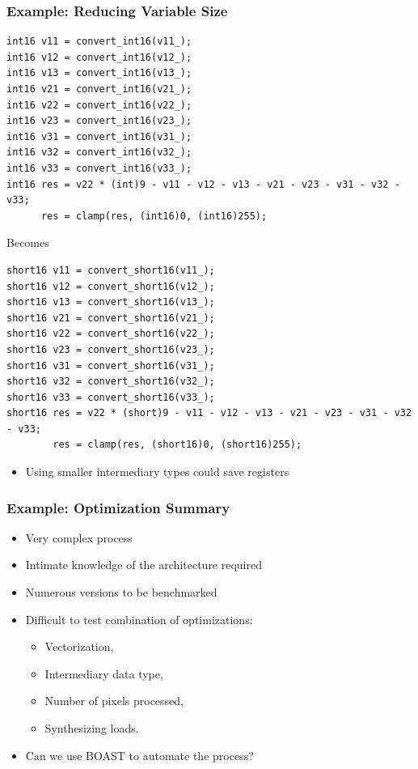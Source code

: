\documentclass{beamer}
\begin{document}
\begin{frame}[fragile]
  \frametitle{Example: Reducing Variable Size}
\lstset{style=CL}
\tiny
\begin{lstlisting}
int16 v11 = convert_int16(v11_);
int16 v12 = convert_int16(v12_);
int16 v13 = convert_int16(v13_);
int16 v21 = convert_int16(v21_);
int16 v22 = convert_int16(v22_);
int16 v23 = convert_int16(v23_);
int16 v31 = convert_int16(v31_);
int16 v32 = convert_int16(v32_);
int16 v33 = convert_int16(v33_);
int16 res = v22 * (int)9 - v11 - v12 - v13 - v21 - v23 - v31 - v32 - v33;
      res = clamp(res, (int16)0, (int16)255);
\end{lstlisting}
\normalsize
\centering Becomes
\tiny
\begin{lstlisting}
short16 v11 = convert_short16(v11_);
short16 v12 = convert_short16(v12_);
short16 v13 = convert_short16(v13_);
short16 v21 = convert_short16(v21_);
short16 v22 = convert_short16(v22_);
short16 v23 = convert_short16(v23_);
short16 v31 = convert_short16(v31_);
short16 v32 = convert_short16(v32_);
short16 v33 = convert_short16(v33_);
short16 res = v22 * (short)9 - v11 - v12 - v13 - v21 - v23 - v31 - v32 - v33;
        res = clamp(res, (short16)0, (short16)255);
\end{lstlisting}
\begin{itemize}
\item Using smaller intermediary types could save registers
\end{itemize}
\end{frame}


\begin{frame}
  \frametitle{Example: Optimization Summary}
  \begin{itemize}
    \item Very complex process
    \item Intimate knowledge of the architecture required
    \item Numerous versions to be benchmarked
    \item Difficult to test combination of optimizations:
    \begin{itemize}
      \item Vectorization,
      \item Intermediary data type,
      \item Number of pixels processed,
      \item Synthesizing loads.
    \end{itemize}
    \item Can we use BOAST to automate the process?
  \end{itemize}
\end{frame}
\end{document}
